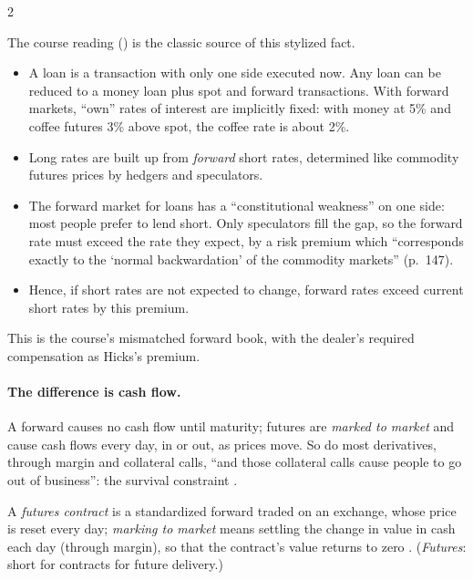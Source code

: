 \begin{paracol}{2}
\begin{reading}
The course reading () is the classic source of this stylized fact.
\begin{itemize}
  \item A loan is a transaction with only one side executed now. Any loan can be reduced to a money loan plus spot and forward transactions. With forward markets, ``own'' rates of interest are implicitly fixed: with money at 5\% and coffee futures 3\% above spot, the coffee rate is about 2\%.
  \item Long rates are built up from \emph{forward} short rates, determined like commodity futures prices by hedgers and speculators.
  \item The forward market for loans has a ``constitutional weakness'' on one side: most people prefer to lend short. Only speculators fill the gap, so the forward rate must exceed the rate they expect, by a risk premium which ``corresponds exactly to the `normal backwardation' of the commodity markets'' (p.~147).
  \item Hence, if short rates are not expected to change, forward rates exceed current short rates by this premium.
\end{itemize}
This is the course's mismatched forward book, with the dealer's required compensation as Hicks's premium.
\end{reading}

\paragraph{The difference is cash flow.} A forward causes no cash flow until maturity; futures are \emph{marked to market} and cause cash flows every day, in or
out, as prices move. So do most derivatives, through margin and collateral calls, ``and those collateral calls cause people to go out of business'': the survival
constraint .

\begin{definition}
A \emph{futures contract} is a standardized forward traded on an exchange, whose price is reset every day; \emph{marking to market} means settling the change in
value in cash each day (through margin), so that the contract's value returns to zero . (\emph{Futures}: short for contracts for future delivery.)
\end{definition}


\end{paracol}
